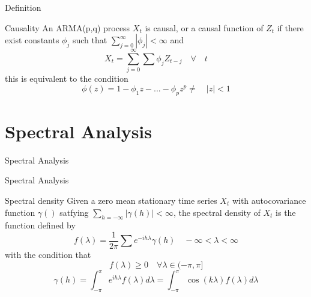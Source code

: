 \documentclass[11pt]{beamer}
\begin{document}
\begin{frame}{Definition \cite{brockwell2002introduction}}
\begin{alertblock}{Causality}
An ARMA(p,q) process ${X_{t}}$ is causal, or a causal function of ${Z_{t}}$ if there exist constants  ${\phi_{j}}$ such that $\sum_{j=0}^{\infty}|\phi_{j}|< \infty$ and
\begin{equation*}
X_{t}=\sum^{\infty}_{j=0}\sum\phi_{j}Z_{t-j}\quad\forall\quad t
\end{equation*}
this is equivalent to the condition 
\begin{equation*}
\phi(z)=1-\phi_{1}z-...-\phi_{p}z^{p}\neq \quad|z|<1
\end{equation*}
\end{alertblock}
\end{frame}

\section{Spectral Analysis}


\begin{frame}
\begin{center}
\Huge
Spectral Analysis
\end{center}
\end{frame}



\begin{frame}{Spectral Analysis \cite{brockwell2002introduction}}
\begin{alertblock}{Spectral density}
Given a zero mean stationary time series ${X_{t}}$ with autocovariance function $\gamma()$ satfying $\sum_{h=-\infty}|\gamma(h)|<\infty$, the spectral density of ${X_{t}}$ is the function defined by
\begin{equation*}
f(\lambda)=\dfrac{1}{2\pi}\sum e^{-ih\lambda}\gamma(h)\quad -\infty<\lambda<\infty
\end{equation*}
with the condition that 
\begin{equation*}
f(\lambda)\geq 0 \quad\forall \lambda \in (-\pi,\pi]
\end{equation*}
\begin{equation*}
\gamma(h)=\int^{\pi}_{-\pi}e^{ih\lambda}f(\lambda)d\lambda = \int^{\pi}_{-\pi} \cos(k\lambda)f(\lambda)d\lambda
\end{equation*}
\end{alertblock}
\end{frame}
\end{document}
